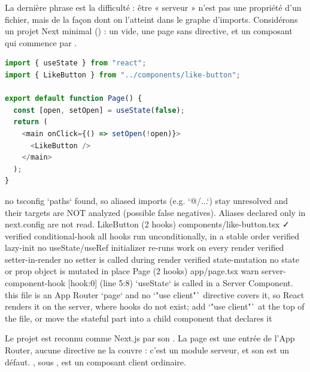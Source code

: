 La dernière phrase est la difficulté : être « serveur » n'est pas une propriété
d'un fichier, mais de la façon dont on l'atteint dans le graphe d'imports.
Considérons un projet Next minimal () : un
 vide, une page  sans directive, et un
composant  qui commence par
.

\begin{lstlisting}[language=TypeScript,caption={\file{app/page.tsx} : un état dans un Server Component (\file{/tmp/ch02next/app/page.tsx})},label={lst:react-modele-page}]
import { useState } from "react";
import { LikeButton } from "../components/like-button";

export default function Page() {
  const [open, setOpen] = useState(false);
  return (
    <main onClick={() => setOpen(!open)}>
      <LikeButton />
    </main>
  );
}
\end{lstlisting}

\begin{sortie}
[warn] no tsconfig `paths` found, so aliased imports (e.g. `@/...`) stay unresolved and their targets are NOT analyzed (possible false negatives). Aliases declared only in next.config are not read.
  LikeButton  (2 hooks)  components/like-button.tsx  ✓
    verified  conditional-hook  all hooks run unconditionally, in a stable order
    verified  lazy-init  no useState/useRef initializer re-runs work on every render
    verified  setter-in-render  no setter is called during render
    verified  state-mutation  no state or prop object is mutated in place
  Page  (2 hooks)  app/page.tsx
    warn   server-component-hook  [hook:0]  (line 5:8)  `useState` is called in a Server Component. this file is an App Router `page` and no `"use client"` directive covers it, so React renders it on the server, where hooks do not exist; add `"use client"` at the top of the file, or move the stateful part into a child component that declares it
\end{sortie}

Le projet est reconnu comme Next.js par son . La page est
une entrée de l'App Router, aucune directive ne la couvre : c'est un module
serveur, et son  est un défaut. , sous
, est un composant client ordinaire.

